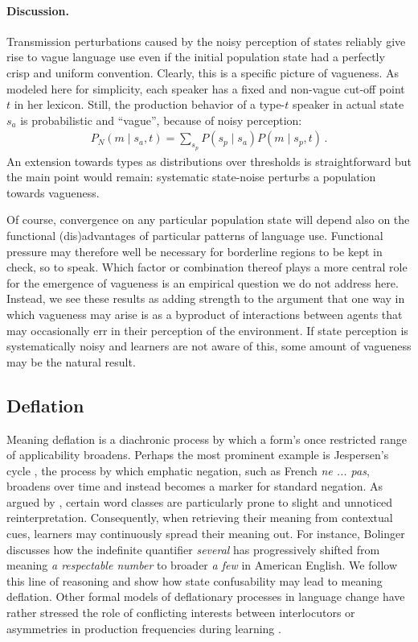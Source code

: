 \documentclass[10pt,a4paper]{article}
\begin{document}
\paragraph{Discussion.}
Transmission perturbations caused by the noisy perception of states reliably give rise to vague
language use even if the initial population state had a perfectly crisp and uniform
convention. Clearly, this is a specific picture of vagueness. As modeled here for simplicity,
each speaker has a fixed and non-vague cut-off point $t$ in her lexicon. Still, the production
behavior of a type-$t$ speaker in actual state $s_a$ is probabilistic and ``vague'', because of
noisy perception:
\begin{align*}
  P_N(m \mid s_a, t) = \sum_{s_p} P(s_p \mid s_a) P(m \mid s_p, t)\,.
\end{align*}
An extension towards types as distributions over thresholds is straightforward but the main
point would remain: systematic state-noise perturbs a population towards vagueness. 

Of course, convergence on any particular population state will depend also on the functional
(dis)advantages of particular patterns of language use. Functional pressure may therefore well
be necessary for borderline regions to be kept in check, so to speak. Which factor or
combination thereof plays a more central role for the emergence of vagueness is an empirical
question we do not address here. Instead, we see these results as adding strength to the
argument that one way in which vagueness may arise is as a byproduct of interactions between
agents that may occasionally err in their perception of the environment. If state perception is
systematically noisy and learners are not aware of this, some amount of vagueness may be the
natural result.

\subsection{Deflation}
Meaning deflation is a diachronic process by which a form's once restricted range of
applicability broadens. Perhaps the most prominent example is Jespersen's cycle
\citep{dahl:1979}, the process by which emphatic negation, such as French {\em ne ... pas},
broadens over time and instead becomes a marker for standard negation. As argued by
\citet{bolinger:1981}, certain word classes are particularly prone to slight and unnoticed
reinterpretation. Consequently, when retrieving their meaning from contextual cues, learners
may continuously spread their meaning out. For instance, Bolinger discusses how the indefinite
quantifier {\em several} has progressively shifted from meaning {\em a respectable number} to
broader {\em a few} in American English. We follow this line of reasoning and show how state
confusability may lead to meaning deflation. Other formal models of deflationary processes in
language change have rather stressed the role of conflicting interests between interlocutors
\citep{AhernClark2014:Diachronic-Proc} or asymmetries in production frequencies during learning
\citep{Schaden2012:Modelling-the-A,Deo2015:The-Semantic-an}.
\end{document}
